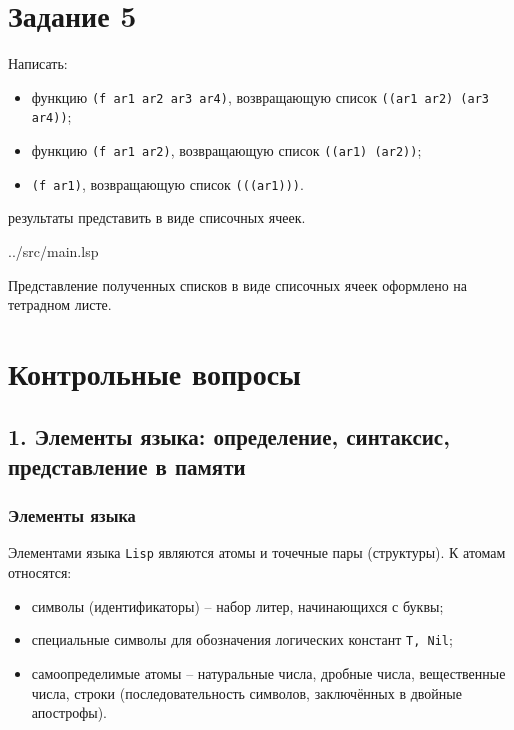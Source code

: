 \section*{Задание 5}


Написать:

\begin{itemize}[topsep=0pt, noitemsep]
	\item функцию {\texttt{(f ar1 ar2 ar3 ar4)}}, возвращающую список {\texttt{((ar1 ar2) (ar3 ar4))}};

	\item функцию {\texttt{(f ar1 ar2)}}, возвращающую список {\texttt{((ar1) (ar2))}};

	\item {\texttt{(f ar1)}}, возвращающую список {\texttt{(((ar1)))}}.

\end{itemize}


результаты представить в виде списочных ячеек.


\begin{lstinputlisting}[
	caption={Задание 4},
	label={lst:t4},
	style={lsp},
	linerange={34-41},
	]{../src/main.lsp}
\end{lstinputlisting}

Представление полученных списков в виде списочных ячеек оформлено на тетрадном листе.



\section*{Контрольные вопросы}

\subsection*{1. Элементы языка: определение, синтаксис, представление в памяти}

\subsubsection{Элементы языка}

Элементами языка {\texttt{Lisp}} являются атомы и точечные пары (структуры). К атомам относятся:
\begin{itemize}[topsep=0pt, noitemsep]
	\item символы (идентификаторы) -- набор литер, начинающихся с буквы;
	\item специальные символы для обозначения логических констант {\texttt{T,~Nil}};
	\item самоопределимые атомы -- натуральные числа, дробные числа, вещественные числа, строки (последовательность символов, заключённых в двойные апострофы).
\end{itemize}

